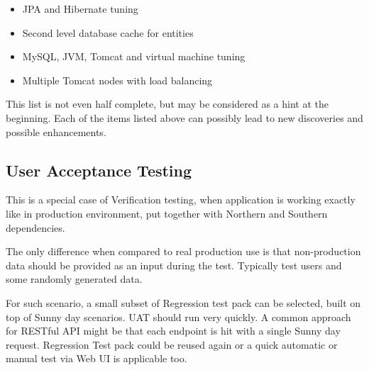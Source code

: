 	\begin{itemize}
		\item JPA and Hibernate tuning
		\item Second level database cache for entities
		\item MySQL, JVM, Tomcat and virtual machine tuning
		\item Multiple Tomcat nodes with load balancing 
	\end{itemize}
	
	This list is not even half complete, but may be considered as a hint at the beginning. Each of the items listed above
	can possibly lead to new discoveries and possible enhancements.
	
	\subsection{User Acceptance Testing}
	
	This is a special case of Verification testing, when application is working exactly like in production environment, put
	together with Northern and Southern dependencies.
	
	The only difference when compared to real production use is that non-production data should be provided as an input
	during the test. Typically test users and some randomly generated data.
	
	For such scenario, a small subset of Regression test pack can be selected, built on top of Sunny day scenarios.
	UAT should run very quickly. A common approach for RESTful API might be that each endpoint is hit with a single Sunny
	day request. Regression Test pack could be reused again or a quick automatic or manual test via Web UI is applicable
	too.
